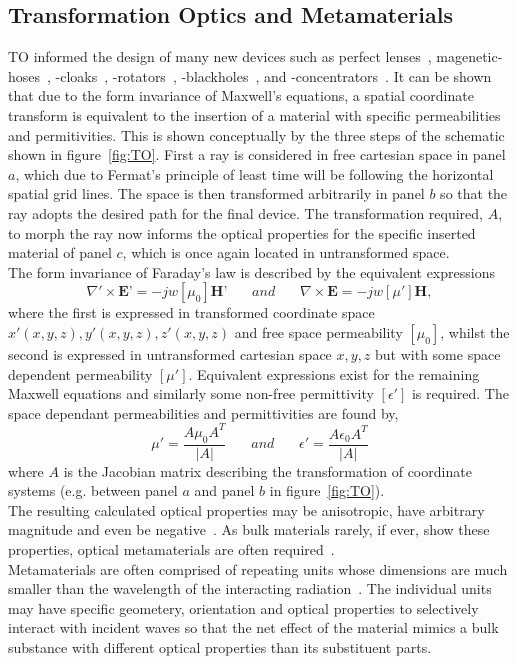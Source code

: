 \documentclass[11pt]{iopart}
\begin{document}
\subsection{Transformation Optics and Metamaterials}
TO informed the design of many new devices such as perfect
lenses~\cite{}, magenetic-hoses~\cite{}, -cloaks~\cite{},
-rotators~\cite{}, -blackholes~\cite{}, and -concentrators~\cite{}. It
can be shown that due to the form invariance of Maxwell's equations, a
spatial coordinate transform is equivalent to the insertion of a
material with specific permeabilities and permitivities. This is shown
conceptually by the three steps of the schematic shown in
figure~\ref{fig:TO}. First a ray is considered in free cartesian space
in panel $a$, which due to Fermat's principle of least time will be
following the horizontal spatial grid lines.  The space is then
transformed arbitrarily in panel $b$ so that the ray adopts the
desired path for the final device. The transformation required, $A$,
to morph the ray now informs the optical properties for the specific
inserted material of panel $c$, which is once again located in
untransformed space.\\ The form invariance of Faraday's law is
described by the equivalent expressions
\begin{equation}
  \label{ME1}
  \nabla'\times \textbf{E'} = -jw[\mu_0]\textbf{H'}
  ~~~~~~~~and~~~~~~~~
  \nabla\times \textbf{E} = -jw[\mu']\textbf{H},
\end{equation}
where the first is expressed in transformed coordinate space $x'(x, y,
z), y'(x, y, z), z'(x, y, z)$ and free space permeability $[\mu_0]$,
whilst the second is expressed in untransformed cartesian space $x, y,
z$ but with some space dependent permeability $[\mu']$.  Equivalent
expressions exist for the remaining Maxwell equations and similarly
some non-free permittivity $[\epsilon']$ is required. The space
dependant permeabilities and permittivities are found by,
\begin{equation}
  \label{eqn:J}
  \mu'=\frac{A\mu_0 A^T}{|A|}
  ~~~~~~~~and~~~~~~~~
  \epsilon'=\frac{A\epsilon_0 A^T}{|A|}
\end{equation}
where $A$ is the Jacobian matrix describing the transformation of
coordinate systems (e.g. between panel $a$ and panel $b$ in
figure~\ref{fig:TO}). \\ The resulting calculated optical properties
may be anisotropic, have arbitrary magnitude and even be
negative~\cite{}. As bulk materials rarely, if ever, show these
properties, optical metamaterials are often
required~\cite{META3}. \\ Metamaterials are often comprised of
repeating units whose dimensions are much smaller than the wavelength
of the interacting radiation~\cite{META2}. The individual units may
have specific geometery, orientation and optical properties to
selectively interact with incident waves so that the net effect of the
material mimics a bulk substance with different optical properties
than its substituent parts.\\
\end{document}
